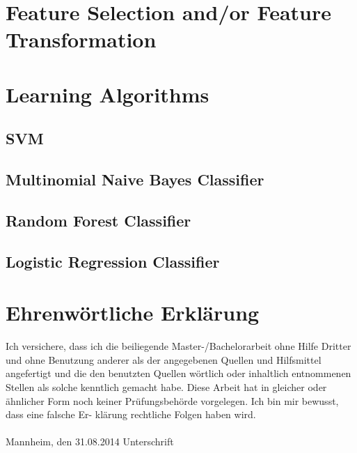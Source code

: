 \documentclass[a4paper, 11pt,titlepage,oneside,openany]{book}
\begin{document}
\section{Feature Selection and/or Feature Transformation}
\section{Learning Algorithms}
\subsection{SVM}
\subsection{Multinomial Naive Bayes Classifier}
\subsection{Random Forest Classifier}
\subsection{Logistic Regression Classifier}
\newpage


\pagestyle{empty}


\section*{Ehrenw\"ortliche Erkl\"arung}
Ich versichere, dass ich die beiliegende Master-/Bachelorarbeit ohne Hilfe Dritter
und ohne Benutzung anderer als der angegebenen Quellen und Hilfsmittel
angefertigt und die den benutzten Quellen w\"ortlich oder inhaltlich
entnommenen Stellen als solche kenntlich gemacht habe. Diese Arbeit
hat in gleicher oder \"ahnlicher Form noch keiner Pr\"ufungsbeh\"orde
vorgelegen. Ich bin mir bewusst, dass eine falsche Er- kl\"arung rechtliche Folgen haben
wird.
\\
\\

\noindent
Mannheim, den 31.08.2014 \hspace{4cm} Unterschrift
\end{document}
